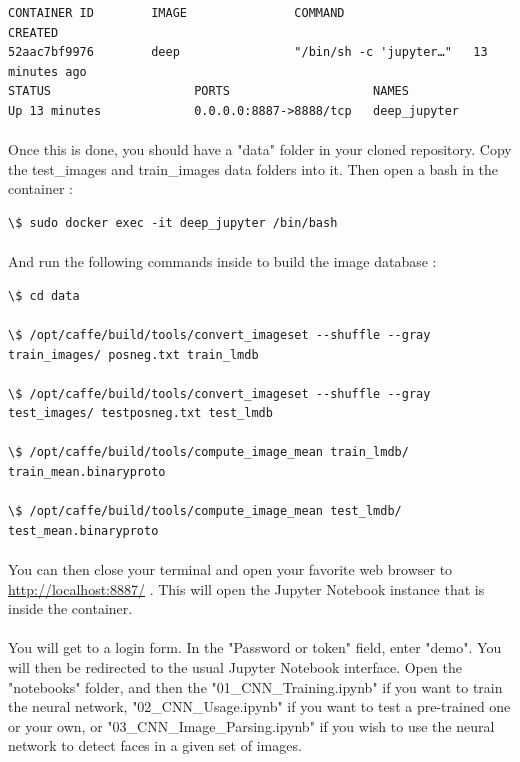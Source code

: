 \documentclass[french]{article}
\begin{document}
\begin{verbatim}
CONTAINER ID        IMAGE               COMMAND                  CREATED       
52aac7bf9976        deep                "/bin/sh -c 'jupyter…"   13 minutes ago
STATUS                    PORTS                    NAMES
Up 13 minutes             0.0.0.0:8887->8888/tcp   deep_jupyter
\end{verbatim}

\paragraph{} Once this is done, you should have a "data" folder in your cloned repository. Copy the test\_images and train\_images data folders into it. Then open a bash in the container :

\begin{verbatim}
\$ sudo docker exec -it deep_jupyter /bin/bash
\end{verbatim}

\paragraph{} And run the following commands inside to build the image database :

\begin{verbatim}
\$ cd data

\$ /opt/caffe/build/tools/convert_imageset --shuffle --gray
train_images/ posneg.txt train_lmdb

\$ /opt/caffe/build/tools/convert_imageset --shuffle --gray
test_images/ testposneg.txt test_lmdb

\$ /opt/caffe/build/tools/compute_image_mean train_lmdb/ train_mean.binaryproto

\$ /opt/caffe/build/tools/compute_image_mean test_lmdb/ test_mean.binaryproto
\end{verbatim}

\paragraph{} You can then close your terminal and open your favorite web browser to \url{http://localhost:8887/} . This will open the Jupyter Notebook instance that is inside the container.

\paragraph{} You will get to a login form. In the "Password or token" field, enter "demo". You will then be redirected to the usual Jupyter Notebook interface. Open the "notebooks" folder, and then the "01\_CNN\_Training.ipynb" if you want to train the neural network, "02\_CNN\_Usage.ipynb" if you want to test a pre-trained one or your own, or "03\_CNN\_Image\_Parsing.ipynb" if you wish to use the neural network to detect faces in a given set of images.
\end{document}
